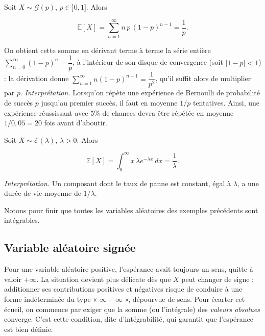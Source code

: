 \begin{exemple}
Soit $X \sim \mathcal{G}(p)$, $p \in ]0, 1]$. Alors

$$
\mathbb{E}[X] = \sum_{n=1}^\infty n\, p\, (1 - p)^{n-1} = \frac{1}{p}.
$$

On obtient cette somme en dérivant terme à terme la série entière $\sum_{n=0}^\infty (1 - p)^n = \dfrac{1}{p}$, à l'intérieur de son disque de convergence (soit $|1 - p| < 1$) : la dérivation donne $\sum_{n=1}^\infty n(1 - p)^{n-1} = \dfrac{1}{p^2}$, qu'il suffit alors de multiplier par $p$. \emph{Interprétation.} Lorsqu'on répète une expérience de Bernoulli de probabilité de succès $p$ jusqu'au premier succès, il faut en moyenne $1/p$ tentatives. Ainsi, une expérience réussissant avec $5\%$ de chances devra être répétée en moyenne $1/0{,}05 = 20$ fois avant d'aboutir.
\end{exemple}

\begin{exemple}
Soit $X \sim \mathcal{E}(\lambda)$, $\lambda > 0$. Alors

$$
\mathbb{E}[X] = \int_0^\infty x\, \lambda e^{-\lambda x}\, dx = \frac{1}{\lambda}.
$$

\emph{Interprétation.} Un composant dont le taux de panne est constant, égal à $\lambda$, a une durée de vie moyenne de $1/\lambda$.
\end{exemple}

Notons pour finir que toutes les variables aléatoires des exemples précédents sont intégrables.

\subsection{Variable aléatoire signée}

Pour une variable aléatoire positive, l'espérance avait toujours un sens, quitte à valoir $+\infty$. La situation devient plus délicate dès que $X$ peut changer de signe : additionner ses contributions positives et négatives risque de conduire à une forme indéterminée du type « $\infty - \infty$ », dépourvue de sens. Pour écarter cet écueil, on commence par exiger que la somme (ou l'intégrale) des \emph{valeurs absolues} converge. C'est cette condition, dite d'intégrabilité, qui garantit que l'espérance est bien définie.

\medskip

